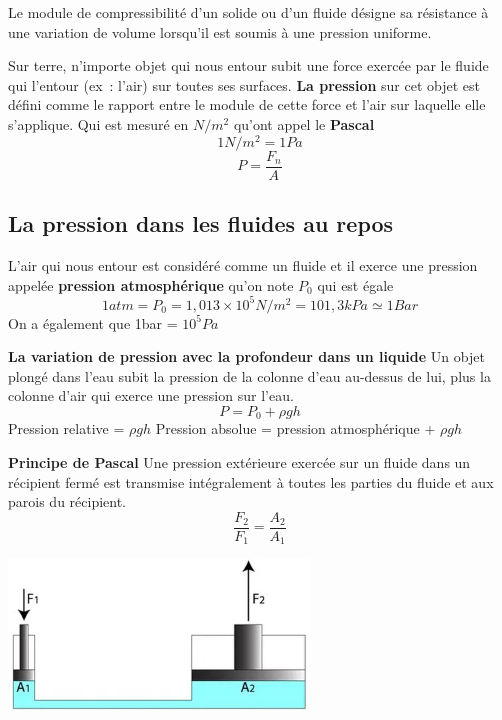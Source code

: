 \documentclass{article}
\begin{document}
Le module de compressibilité d'un solide ou d'un fluide désigne sa résistance à une variation de volume lorsqu'il est soumis à une pression uniforme.
\newline

Sur terre, n'importe objet qui nous entour subit une force exercée par le fluide qui l'entour (ex : l'air) sur toutes ses surfaces. \textbf{La pression} sur cet objet est défini comme le rapport entre le module de cette force et l'air sur laquelle elle s'applique. Qui est mesuré en $N/m^2$ qu'ont appel le \textbf{Pascal}
\[1N/m^2 = 1Pa\]
\[P = \frac{F_n}{A}\]

\subsection{La pression dans les fluides au repos}
L'air qui nous entour est considéré comme un fluide et il exerce une pression appelée \textbf{pression atmosphérique} qu'on note $P_0$ qui est égale 
\[1 atm = P_0 = 1,013\times10^5N/m^2 = 101,3kPa \simeq 1Bar\]
On a également que 1bar = $10^5Pa$
\newline

\noindent
\textbf{La variation de pression avec la profondeur dans un liquide}
\newline
Un objet plongé dans l'eau subit la pression de la colonne d'eau au-dessus de lui, plus la colonne d'air qui exerce une pression sur l'eau.
\[P = P_0 + \rho gh\]
Pression relative = $\rho gh$
\newline
Pression absolue = pression atmosphérique + $\rho gh$
\newline

\noindent
\textbf{Principe de Pascal}
\newline
Une pression extérieure exercée sur un fluide dans un récipient fermé est transmise intégralement à toutes les parties du fluide et aux parois du récipient.
\[\frac{F_2}{F_1} = \frac{A_2}{A_1}\]
\begin{center}
    \includegraphics[width=8cm]{Image/PrincipePascal.png}
\end{center}
\end{document}
